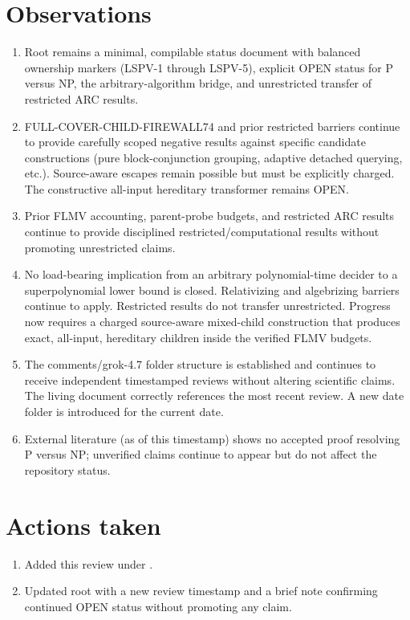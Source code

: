 \documentclass[11pt]{article}
\begin{document}
\section{Observations}
\begin{enumerate}
\item Root  remains a minimal, compilable status document with balanced ownership markers (LSPV-1 through LSPV-5), explicit OPEN status for P versus NP, the arbitrary-algorithm bridge, and unrestricted transfer of restricted ARC results.
\item FULL-COVER-CHILD-FIREWALL74 and prior restricted barriers continue to provide carefully scoped negative results against specific candidate constructions (pure block-conjunction grouping, adaptive detached querying, etc.). Source-aware escapes remain possible but must be explicitly charged. The constructive all-input hereditary transformer remains OPEN.
\item Prior FLMV accounting, parent-probe budgets, and restricted ARC results continue to provide disciplined restricted/computational results without promoting unrestricted claims.
\item No load-bearing implication from an arbitrary polynomial-time decider to a superpolynomial lower bound is closed. Relativizing and algebrizing barriers continue to apply. Restricted results do not transfer unrestricted. Progress now requires a charged source-aware mixed-child construction that produces exact, all-input, hereditary children inside the verified FLMV budgets.
\item The comments/grok-4.7 folder structure is established and continues to receive independent timestamped reviews without altering scientific claims. The living document correctly references the most recent review. A new date folder  is introduced for the current date.
\item External literature (as of this timestamp) shows no accepted proof resolving P versus NP; unverified claims continue to appear but do not affect the repository status.
\end{enumerate}

\section{Actions taken}
\begin{enumerate}
\item Added this review under .
\item Updated root  with a new review timestamp and a brief note confirming continued OPEN status without promoting any claim.
\end{enumerate}
\end{document}
